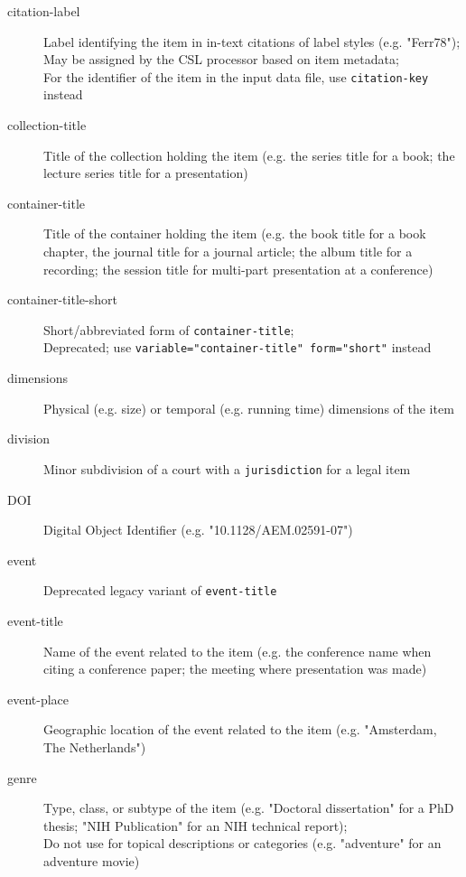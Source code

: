 \begin{description}
  \item[citation-label]
    Label identifying the item in in-text citations of label styles (e.g.
    "Ferr78");\\
    May be assigned by the CSL processor based on item metadata;\\
    For the identifier of the item in the input data file, use
    \texttt{citation-key} instead

  \item[collection-title]
    Title of the collection holding the item (e.g. the series title for a
    book; the lecture series title for a presentation)

  \item[container-title]
    Title of the container holding the item (e.g. the book title for a book
    chapter, the journal title for a journal article; the album title for a
    recording; the session title for multi-part presentation at a
    conference)

  \item[container-title-short]
    Short/abbreviated form of \texttt{container-title};\\
    Deprecated; use \texttt{variable="container-title"\ form="short"}
    instead

  \item[dimensions]
    Physical (e.g. size) or temporal (e.g. running time) dimensions of the
    item

  \item[division]
    Minor subdivision of a court with a \texttt{jurisdiction} for a legal
    item

  \item[DOI]
    Digital Object Identifier (e.g. "10.1128/AEM.02591-07")

  \item[event]
    Deprecated legacy variant of \texttt{event-title}

  \item[event-title]
    Name of the event related to the item (e.g. the conference name when
    citing a conference paper; the meeting where presentation was made)

  \item[event-place]
    Geographic location of the event related to the item (e.g. "Amsterdam,
    The Netherlands")

  \item[genre]
    Type, class, or subtype of the item (e.g. "Doctoral dissertation" for a
    PhD thesis; "NIH Publication" for an NIH technical report);\\
    Do not use for topical descriptions or categories (e.g. "adventure" for
    an adventure movie)


\end{description}
